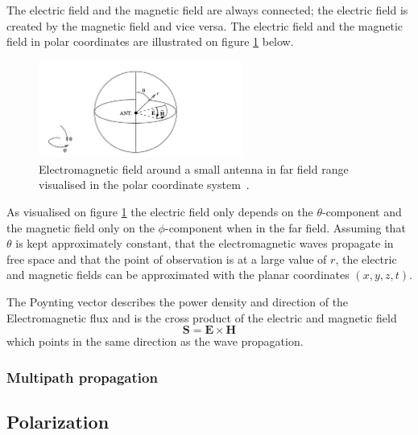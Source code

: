 The electric field and the magnetic field are always connected; the electric field is created by the magnetic field and vice versa. The electric field and the magnetic field in polar coordinates are illustrated on figure \ref{fig:em_field} below.
\begin{figure}[h]
    \centering
    \includegraphics[width=0.6\textwidth]{figures/em_polar_coordinates.png}
    \caption{Electromagnetic field around a small antenna in far field range visualised in the polar coordinate system~\cite[p. 58]{maxwell_theory}.} \label{fig:em_field}
\end{figure}

As visualised on figure \ref{fig:em_field} the electric field only depends on the $\theta$-component and the magnetic field only on the $\phi$-component when in the far field. Assuming that $\theta$ is kept approximately constant, that the electromagnetic waves propagate in free space and that the point of observation is at a large value of $r$, the electric and magnetic fields can be approximated with the planar coordinates $\left( x, y, z, t \right)$.

The Poynting vector describes the power density and direction of the Electromagnetic flux and is the cross product of the electric and magnetic field 
\begin{equation}
    \textbf{S} = \textbf{E} \times \textbf{H}
\end{equation}
which points in the same direction as the wave propagation. 

\subsubsection{Multipath propagation}

\subsection{Polarization}

